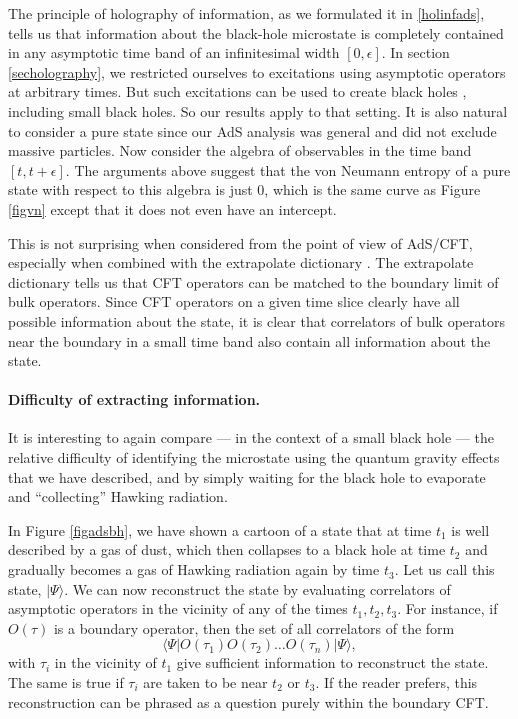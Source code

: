 \documentclass[12pt]{article}
\newcommand{\be}{\begin{equation}}
\newcommand{\ee}{\end{equation}}
\begin{document}
The principle of holography of information, as we formulated it in \ref{holinfads}, tells us that information about the black-hole microstate is completely contained in any asymptotic time band of an infinitesimal width $[0, \epsilon]$. In section 
 \ref{secholography}, we restricted ourselves to excitations using asymptotic operators at arbitrary times. But such excitations can be used to create black holes \cite{Bhattacharyya:2009uu}, including small black holes. So our results apply to that setting.  It is also natural to consider a pure state since our AdS analysis was general and did not exclude massive particles. Now consider the algebra of observables in the time band $[t, t + \epsilon]$.  The arguments above suggest that the von Neumann entropy of a pure state with respect to this algebra is just $0$, which is the same curve as Figure \ref{figvn} except that it does not even have an intercept.

This is not surprising when considered from the point of view of AdS/CFT, especially when combined with the extrapolate dictionary \cite{Banks:1998dd}. The extrapolate dictionary tells us that CFT operators can be matched to the boundary limit of bulk operators. Since CFT operators on a given time slice clearly have all possible information about the state, it is clear that correlators of bulk operators near the boundary in a small time band also contain all information about the state.

\paragraph{\bf Difficulty of extracting information.} 
It is interesting to again compare --- in the context of a small black hole --- the relative difficulty of identifying the microstate using the quantum gravity effects that we have described,  and by simply waiting for the black hole to evaporate and ``collecting'' Hawking radiation. 

In Figure \ref{figadsbh}, we have shown a cartoon of a state that at time $t_1$ is well described by a gas of dust, which then collapses to a black hole at time $t_2$ and gradually becomes a gas of Hawking radiation again by time $t_3$.  Let us call this state, $|\Psi \rangle$.  We can now reconstruct the state by evaluating correlators of asymptotic operators in the vicinity of  any of the times $t_1, t_2, t_3$. For instance, if $O(\tau)$ is a boundary operator, then the set of all correlators of the form
\be
\langle \Psi | O(\tau_{1}) O(\tau_{2}) \ldots O(\tau_{n}) |\Psi \rangle,
\ee
with $\tau_i$ in the vicinity of $t_1$ give sufficient information to reconstruct the state. The same is true if $\tau_i$ are taken to be near $t_2$ or $t_3$.  If the reader prefers, this reconstruction can be phrased as a question purely within the boundary CFT. 
\end{document}
